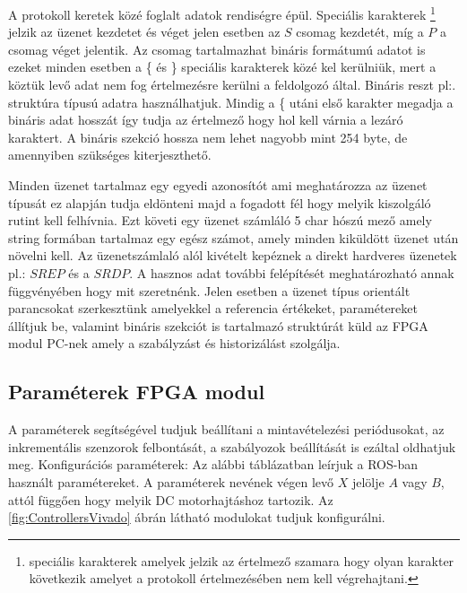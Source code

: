 \renewcommand{\img}{SajatRobot/FPGAmodulok/ProtokolDiagram.jpg}
\renewcommand{\sources}{*}
\renewcommand{\captionn}{FPGA komunikacios protokol altalanos csomag szerkezet}
\renewcommand{\figlabel}{FPGAComCsomagAlt}



A protokoll keretek közé foglalt adatok rendiségre épül. Speciális karakterek \footnote{speciális karakterek amelyek jelzik az értelmező szamara hogy olyan karakter következik amelyet a protokoll értelmezésében nem kell végrehajtani.} jelzik az üzenet kezdetet és véget jelen esetben az $S$ csomag kezdetét, míg a $P$ a csomag véget jelentik.
Az csomag tartalmazhat bináris formátumú adatot is ezeket minden esetben a \{ és \} speciális karakterek közé kel kerülniük, mert a köztük levő adat nem fog értelmezésre kerülni a feldolgozó által. Bináris reszt  pl:. struktúra típusú adatra használhatjuk. Mindig a \{ utáni első karakter megadja a bináris adat hosszát így tudja az értelmező hogy hol kell várnia a lezáró karaktert. A bináris szekció hossza nem lehet nagyobb mint 254 byte, de amennyiben szükséges kiterjeszthető.

Minden üzenet tartalmaz egy egyedi azonosítót ami meghatározza az üzenet típusát ez alapján tudja eldönteni majd a fogadott fél hogy melyik kiszolgáló rutint kell felhívnia. Ezt követi egy üzenet számláló 5 char hószú mező amely string formában tartalmaz egy egész számot, amely minden kiküldött üzenet után növelni kell. Az üzenetszámlaló alól kivételt kepéznek a direkt hardveres üzenetek pl.: $SREP$ és a $SRDP$.
A hasznos adat további felépítését meghatározható annak függvényében hogy mit szeretnénk. Jelen esetben a üzenet típus orientált parancsokat szerkesztünk amelyekkel a referencia értékeket, paramétereket állítjuk be, valamint bináris szekciót is tartalmazó struktúrát küld az FPGA modul PC-nek amely a szabályzást és historizálást szolgálja.

\subsection{Paraméterek FPGA modul}

A paraméterek segítségével tudjuk beállítani a mintavételezési periódusokat, az inkrementális szenzorok felbontását, a szabályozok beállítását is ezáltal oldhatjuk meg.
Konfigurációs paraméterek:
Az alábbi táblázatban leírjuk a ROS-ban használt paramétereket. A paraméterek nevének végen levő $X$ jelölje $A$ vagy $B$, attól függően hogy melyik DC motorhajtáshoz tartozik. Az \ref{fig:ControllersVivado} ábrán látható modulokat tudjuk konfigurálni.

